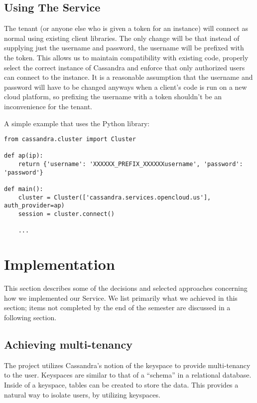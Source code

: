 \documentclass[11pt,notitlepage]{report}
\begin{document}
\section*{Using The Service}

The tenant (or anyone else who is given a token for an instance) will connect as normal using existing client libraries. The only change will be that instead of supplying just the username and password, the username will be prefixed with the token. This allows us to maintain compatibility with existing code, properly select the correct instance of Cassandra and enforce that only authorized users can connect to the instance. It is a reasonable assumption that the username and password will have to be changed anyways when a client’s code is run on a new cloud platform, so prefixing the username with a token shouldn’t be an inconvenience for the tenant.

A simple example that uses the Python library:

\lstset{language=Python,showspaces=false,showstringspaces=false,basicstyle=\footnotesize}
\begin{lstlisting}
from cassandra.cluster import Cluster

def ap(ip):
    return {'username': 'XXXXXX_PREFIX_XXXXXXusername', 'password': 'password'}

def main():
    cluster = Cluster(['cassandra.services.opencloud.us'], auth_provider=ap)
    session = cluster.connect()

    ...
\end{lstlisting}

\chapter*{Implementation}

This section describes some of the decisions and selected approaches concerning how we implemented our Service. We list primarily what we achieved in this section; items not completed by the end of the semester are discussed in a following section.


\section*{Achieving multi-tenancy}

The project utilizes Cassandra’s notion of the keyspace to provide multi-tenancy to the user. Keyspaces are similar to that of a “schema” in a relational database. Inside of a keyspace, tables can be created to store the data. This provides a natural way to isolate users, by utilizing keyspaces.
\end{document}
